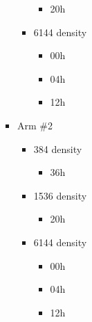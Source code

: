 \documentclass[]{article}
\providecommand{\tightlist}{%
  \setlength{\itemsep}{0pt}\setlength{\parskip}{0pt}}
\begin{document}
\begin{enumerate}
\begin{itemize}
\begin{itemize}
\begin{itemize}
\begin{itemize}
\begin{itemize}
            \begin{itemize}
            \tightlist
            \item
              20h
            \end{itemize}
          \item
            6144 density

            \begin{itemize}
            \tightlist
            \item
              00h
            \item
              04h
            \item
              12h
            \end{itemize}
          \end{itemize}
        \item
          Arm \#2

          \begin{itemize}
          \tightlist
          \item
            384 density

            \begin{itemize}
            \tightlist
            \item
              36h
            \end{itemize}
          \item
            1536 density

            \begin{itemize}
            \tightlist
            \item
              20h
            \end{itemize}
          \item
            6144 density

            \begin{itemize}
            \tightlist
            \item
              00h
            \item
              04h
            \item
              12h
            \end{itemize}
          \end{itemize}
        \end{itemize}
      \end{itemize}
    \end{itemize}
  \end{itemize}
\end{enumerate}
\end{document}
